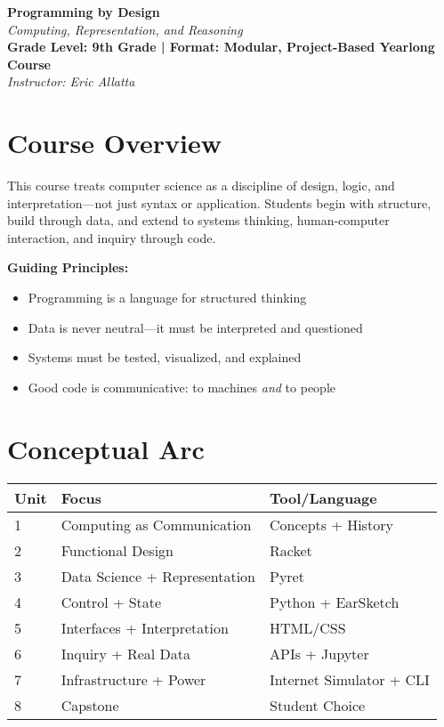 \documentclass[11pt]{article}
\begin{document}
\begin{center}
  {\LARGE \textbf{Programming by Design}} \\[0.25em]
  {\large \textit{Computing, Representation, and Reasoning}} \\[0.5em]
  \textbf{Grade Level: 9th Grade \quad | \quad Format: Modular, Project-Based Yearlong Course} \\[0.5em]
  \textit{Instructor: Eric Allatta}
\end{center}

\section*{Course Overview}
This course treats computer science as a discipline of design, logic, and interpretation—not just syntax or application. Students begin with structure, build through data, and extend to systems thinking, human-computer interaction, and inquiry through code.

\textbf{Guiding Principles:}
\begin{itemize}[leftmargin=*]
  \item Programming is a language for structured thinking
  \item Data is never neutral—it must be interpreted and questioned
  \item Systems must be tested, visualized, and explained
  \item Good code is communicative: to machines \textit{and} to people
\end{itemize}

\section*{Conceptual Arc}
\begin{center}
\begin{tabular}{|l|l|l|}
  \hline
  \textbf{Unit} & \textbf{Focus} & \textbf{Tool/Language} \\
  \hline
  1 & Computing as Communication & Concepts + History \\
  2 & Functional Design & Racket \\
  3 & Data Science + Representation & Pyret \\
  4 & Control + State & Python + EarSketch \\
  5 & Interfaces + Interpretation & HTML/CSS \\
  6 & Inquiry + Real Data & APIs + Jupyter \\
  7 & Infrastructure + Power & Internet Simulator + CLI \\
  8 & Capstone & Student Choice \\
  \hline
\end{tabular}
\end{center}
\end{document}
